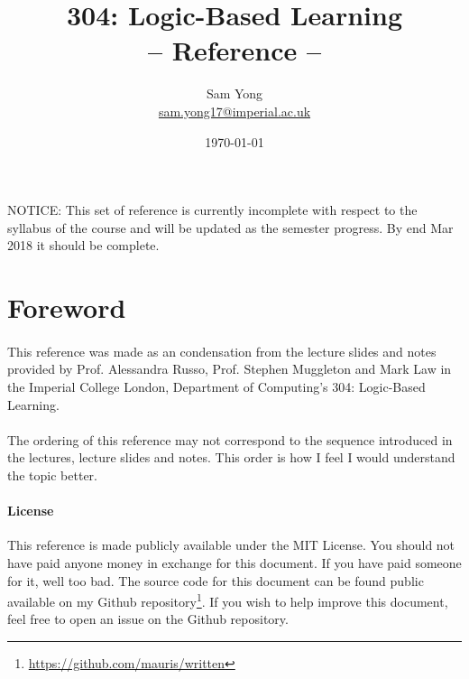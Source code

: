 \documentclass{article}
\title{
	 \huge 304: Logic-Based Learning\\
	 \huge -- Reference --
}
\date{\today}
\author{
	Sam Yong \\
	\small \href{mailto:sam.yong17@imperial.ac.uk}{sam.yong17@imperial.ac.uk}
}
\theoremstyle{plain}
\theoremstyle{definition}
\begin{document}
\maketitle

\begin{multicols}{2}

\paragraph{} NOTICE: This set of reference is currently incomplete with respect to the syllabus of the course and will be updated as the semester progress. By end Mar 2018 it should be complete.

\section*{Foreword}  

\paragraph{} This reference was made as an condensation from the lecture slides and notes provided by Prof. Alessandra Russo, Prof. Stephen Muggleton and Mark Law in the Imperial College London, Department of Computing's 304: Logic-Based Learning.

\paragraph{} The ordering of this reference may not correspond to the sequence introduced in the lectures, lecture slides and notes. This order is how I feel I would understand the topic better.

\begin{footnotesize}
\paragraph{License} This reference is made publicly available under the MIT License. You should not have paid anyone money in exchange for this document. If you have paid someone for it, well too bad. The source code for this document can be found public available on my Github repository\footnote{\href{https://github.com/mauris/written}{https://github.com/mauris/written}}. If you wish to help improve this document, feel free to open an issue on the Github repository.
\end{footnotesize}

\tableofcontents
\newpage


\end{multicols}
\end{document}
